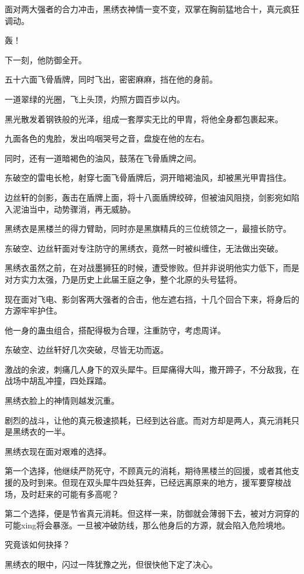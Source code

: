 \begin{this_body}
面对两大强者的合力冲击，黑绣衣神情一变不变，双掌在胸前猛地合十，真元疯狂调动。

轰！

下一刻，他防御全开。

五十六面飞骨盾牌，同时飞出，密密麻麻，挡在他的身前。

一道翠绿的光圈，飞上头顶，灼照方圆百步以内。

黑光散发着钢铁般的光泽，组成一套厚实无比的甲胄，将他全身都包裹起来。

九面各色的鬼脸，发出呜咽哭号之音，盘旋在他的左右。

同时，还有一道暗褐色的油风，鼓荡在飞骨盾牌之间。

东破空的雷电长枪，射穿七面飞骨盾牌后，洞开暗褐油风，却被黑光甲胄挡住。

边丝轩的剑影，轰击在盾牌上面，将十八面盾牌绞碎，但被油风阻挠，剑影宛如陷入泥油当中，动势骤消，再无威胁。

黑绣衣是黑楼兰的得力臂助，同时亦是黑旗精兵的三位统领之一，最擅长防守。

东破空、边丝轩面对专注防守的黑绣衣，竟然一时被纠缠住，无法做出突破。

黑绣衣虽然之前，在对战墨狮狂的时候，遭受惨败。但并非说明他实力低下，而是对方实力太强，乃是历史上此届王庭之争，整个北原的头号猛将。

现在面对飞电、影剑客两大强者的合击，他左遮右挡，十几个回合下来，将身后的方源牢牢护住。

他一身的蛊虫组合，搭配得极为合理，注重防守，考虑周详。

东破空、边丝轩好几次突破，尽皆无功而返。

激战的余波，刺痛几人身下的双头犀牛。巨犀痛得大叫，撒开蹄子，不分敌我，在战场中胡乱冲撞，四处踩踏。

黑绣衣脸上的神情则越发沉重。

剧烈的战斗，让他的真元极速损耗，已经到达谷底。而对方却是两人，真元消耗只是黑绣衣的一半。

黑绣衣现在面对艰难的选择。

第一个选择，他继续严防死守，不顾真元的消耗，期待黑楼兰的回援，或者其他支援的及时到来。但现在双头犀牛四处狂奔，已经远离原来的地方，援军要穿梭战场，及时赶来的可能有多高呢？

第二个选择，便是节省真元消耗。但这样一来，防御就会薄弱下去，被对方洞穿的可能xing将会暴涨。一旦被冲破防线，那么他身后的方源，就会陷入危险境地。

究竟该如何抉择？

黑绣衣的眼中，闪过一阵犹豫之光，但很快他下定了决心。


\end{this_body}
